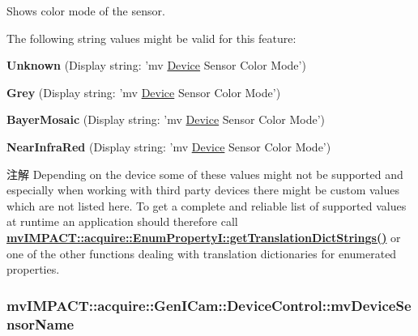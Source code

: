 Shows color mode of the sensor.

The following string values might be valid for this feature\+:
\begin{DoxyItemize}
\item {\bfseries Unknown} (Display string\+: 'mv \hyperlink{classmv_i_m_p_a_c_t_1_1acquire_1_1_device}{Device} Sensor Color Mode')
\item {\bfseries Grey} (Display string\+: 'mv \hyperlink{classmv_i_m_p_a_c_t_1_1acquire_1_1_device}{Device} Sensor Color Mode')
\item {\bfseries Bayer\+Mosaic} (Display string\+: 'mv \hyperlink{classmv_i_m_p_a_c_t_1_1acquire_1_1_device}{Device} Sensor Color Mode')
\item {\bfseries Near\+Infra\+Red} (Display string\+: 'mv \hyperlink{classmv_i_m_p_a_c_t_1_1acquire_1_1_device}{Device} Sensor Color Mode')
\end{DoxyItemize}

\begin{DoxyNote}{注解}
Depending on the device some of these values might not be supported and especially when working with third party devices there might be custom values which are not listed here. To get a complete and reliable list of supported values at runtime an application should therefore call {\bfseries \hyperlink{classmv_i_m_p_a_c_t_1_1acquire_1_1_enum_property_i_a0ba6ccbf5ee69784d5d0b537924d26b6}{mv\+I\+M\+P\+A\+C\+T\+::acquire\+::\+Enum\+Property\+I\+::get\+Translation\+Dict\+Strings()}} or one of the other functions dealing with translation dictionaries for enumerated properties. 
\end{DoxyNote}
\hypertarget{classmv_i_m_p_a_c_t_1_1acquire_1_1_gen_i_cam_1_1_device_control_ab1b2a71a999f0078f7f625a066bc1a1f}{
\subsubsection[{mv\+Device\+Sensor\+Name}]{ mv\+I\+M\+P\+A\+C\+T\+::acquire\+::\+Gen\+I\+Cam\+::\+Device\+Control\+::mv\+Device\+Sensor\+Name}}\label{classmv_i_m_p_a_c_t_1_1acquire_1_1_gen_i_cam_1_1_device_control_ab1b2a71a999f0078f7f625a066bc1a1f}


